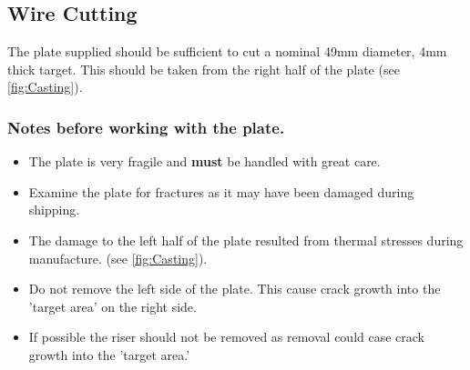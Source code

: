 \subsection{Wire Cutting}
The plate supplied should be sufficient to cut a nominal 49mm diameter, 4mm thick target. This should be taken from the right half of the plate (see \ref{fig:Casting}). 

\subsubsection{Notes before working with the plate.}
\begin{itemize}
\item The plate is very fragile and \textbf{must} be handled with great care. 
\item Examine the plate for fractures as it may have been damaged during shipping. 
\item The damage to the left half of the plate resulted from thermal stresses during manufacture. (see \ref{fig:Casting}). 
\item Do not remove the left side of the plate. This cause crack growth into the 'target area' on the right side.
\item If possible the riser should not be removed as removal could case crack growth into the 'target area.'
\end{itemize}
